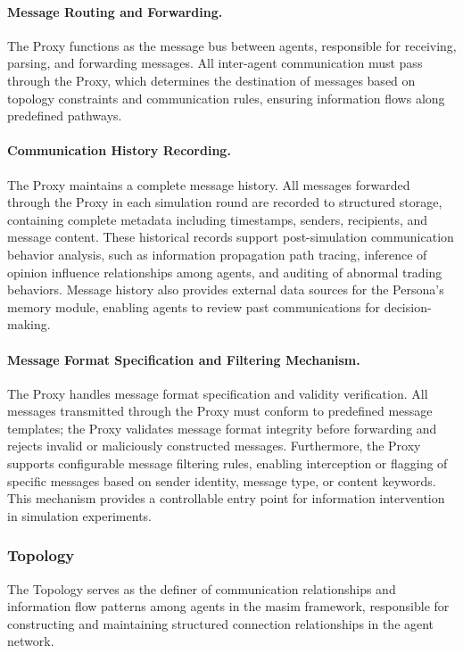 \documentclass{article}
\begin{document}
\paragraph{Message Routing and Forwarding.}
The Proxy functions as the message bus between agents, responsible for receiving, parsing, and forwarding messages. All inter-agent communication must pass through the Proxy, which determines the destination of messages based on topology constraints and communication rules, ensuring information flows along predefined pathways.

\paragraph{Communication History Recording.}
The Proxy maintains a complete message history. All messages forwarded through the Proxy in each simulation round are recorded to structured storage, containing complete metadata including timestamps, senders, recipients, and message content. These historical records support post-simulation communication behavior analysis, such as information propagation path tracing, inference of opinion influence relationships among agents, and auditing of abnormal trading behaviors. Message history also provides external data sources for the Persona's memory module, enabling agents to review past communications for decision-making.

\paragraph{Message Format Specification and Filtering Mechanism.}
The Proxy handles message format specification and validity verification. All messages transmitted through the Proxy must conform to predefined message templates; the Proxy validates message format integrity before forwarding and rejects invalid or maliciously constructed messages. Furthermore, the Proxy supports configurable message filtering rules, enabling interception or flagging of specific messages based on sender identity, message type, or content keywords. This mechanism provides a controllable entry point for information intervention in simulation experiments.

\subsubsection{Topology}
\label{subsubsec:topology}

The Topology serves as the definer of communication relationships and information flow patterns among agents in the masim framework, responsible for constructing and maintaining structured connection relationships in the agent network.
\end{document}

